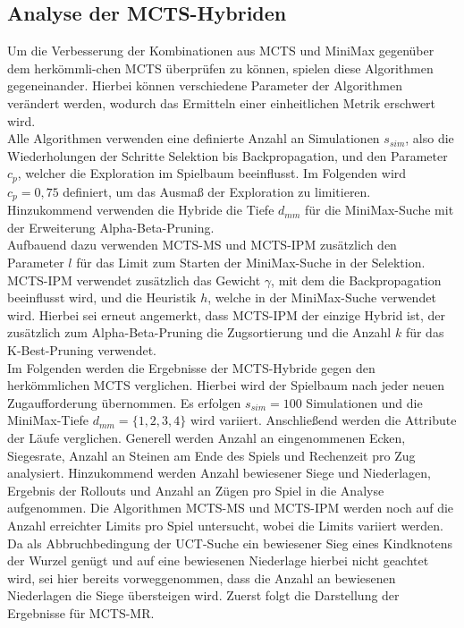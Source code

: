 \documentclass[12pt,a4paper,bibliography=totocnumbered,listof=totocnumbered]{article}
\begin{document}
\subsection{Analyse der MCTS-Hybriden}
Um die Verbesserung der Kombinationen aus MCTS und MiniMax gegenüber dem herkömmli-chen MCTS überprüfen zu können, spielen diese Algorithmen gegeneinander. Hierbei können verschiedene Parameter der Algorithmen verändert werden, wodurch das Ermitteln einer einheitlichen Metrik erschwert wird.\\
Alle Algorithmen verwenden eine definierte Anzahl an Simulationen $s_{sim}$, also die Wiederholungen der Schritte Selektion bis Backpropagation, und den Parameter $c_{p}$, welcher die Exploration im Spielbaum beeinflusst. Im Folgenden wird $c_{p} = 0,75$ definiert, um das Ausmaß der Exploration zu limitieren. Hinzukommend verwenden die Hybride die Tiefe $d_{mm}$ für die MiniMax-Suche mit der Erweiterung Alpha-Beta-Pruning.\\
Aufbauend dazu verwenden MCTS-MS und MCTS-IPM zusätzlich den Parameter $l$ für das Limit zum Starten der MiniMax-Suche in der Selektion. MCTS-IPM verwendet zusätzlich das Gewicht $\gamma$, mit dem die Backpropagation beeinflusst wird, und die Heuristik $h$, welche in der MiniMax-Suche verwendet wird. Hierbei sei erneut angemerkt, dass MCTS-IPM der einzige Hybrid ist, der zusätzlich zum Alpha-Beta-Pruning die Zugsortierung und die Anzahl $k$ für das K-Best-Pruning verwendet.\\
Im Folgenden werden die Ergebnisse der MCTS-Hybride gegen den herkömmlichen MCTS verglichen. Hierbei wird der Spielbaum nach jeder neuen Zugaufforderung übernommen. Es erfolgen $s_{sim} = 100$ Simulationen und die MiniMax-Tiefe $d_{mm} = \{1, 2, 3, 4\}$ wird variiert. Anschließend werden die Attribute der Läufe verglichen. Generell werden Anzahl an eingenommenen Ecken, Siegesrate, Anzahl an Steinen am Ende des Spiels und Rechenzeit pro Zug analysiert. Hinzukommend werden Anzahl bewiesener Siege und Niederlagen, Ergebnis der Rollouts und Anzahl an Zügen pro Spiel in die Analyse aufgenommen. Die Algorithmen MCTS-MS und MCTS-IPM werden noch auf die Anzahl erreichter Limits pro Spiel untersucht, wobei die Limits variiert werden. Da als Abbruchbedingung der UCT-Suche ein bewiesener Sieg eines Kindknotens der Wurzel genügt und auf eine bewiesenen Niederlage hierbei nicht geachtet wird, sei hier bereits vorweggenommen, dass die Anzahl an bewiesenen Niederlagen die Siege übersteigen wird. Zuerst folgt die Darstellung der Ergebnisse für MCTS-MR.
\end{document}
